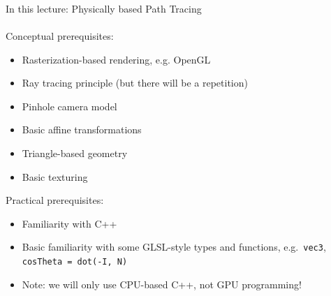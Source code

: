 \documentclass[utf8,stillsansserifmath,fleqn,t]{beamer}
\newcommand{\code}[1]{\texttt{#1}}
\begin{document}
\begin{frame}
\begin{minipage}{.49\textwidth}
\end{minipage}\hfill
\end{frame}

\begin{frame}
\frametitle{\insertsection}
In this lecture: Physically based Path Tracing\\~\\
Conceptual prerequisites:
\begin{itemize}
\item Rasterization-based rendering, e.g. OpenGL
\item Ray tracing principle (but there will be a repetition)
\item Pinhole camera model
\item Basic affine transformations
\item Triangle-based geometry
\item Basic texturing
\end{itemize}
Practical prerequisites:
\begin{itemize}
\item Familiarity with C++
\item Basic familiarity with some GLSL-style types and functions,
    e.g.~\code{vec3}, \code{cosTheta = dot(-I, N)}
\item Note: we will only use CPU-based C++, not GPU programming!
\end{itemize}
\end{frame}
\end{document}
